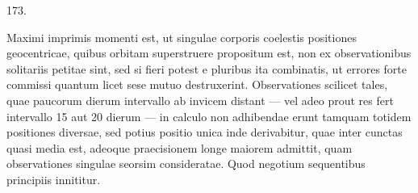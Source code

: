 \par{}\medskip
\begin{center}\hypertarget{native-243-article173}{}173.\end{center}
Maximi imprimis momenti est, ut singulae corporis coelestis positiones
geocentricae, quibus orbitam superstruere propositum est, non ex observationibus
solitariis petitae sint, sed si fieri potest e pluribus ita combinatis, ut
errores forte commissi quantum licet sese mutuo destruxerint. Observationes
scilicet tales, quae paucorum dierum intervallo ab invicem distant --- vel adeo
prout res fert intervallo 15 aut 20 dierum --- in calculo non adhibendae erunt
tamquam totidem positiones diversae, sed potius positio unica inde derivabitur,
quae inter cunctas quasi media est, adeoque praecisionem longe maiorem
admittit, quam observationes singulae seorsim consideratae. Quod negotium
sequentibus principiis innititur.

